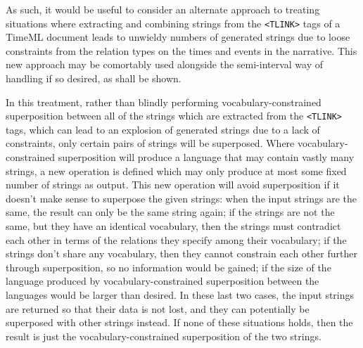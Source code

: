 \documentclass[a4paper,12pt,leqno,twoside]{article}
\begin{document}
As such, it would be useful to consider an alternate approach to treating situations where extracting and combining strings from the \verb|<TLINK>| tags of a TimeML document leads to unwieldy numbers of generated strings due to loose constraints from the relation types on the times and events in the narrative. This new approach may be comortably used alongside the semi-interval way of handling if so desired, as shall be shown.

In this treatment, rather than blindly performing vocabulary-constrained superposition between all of the strings which are extracted from the \verb|<TLINK>| tags, which can lead to an explosion of generated strings due to a lack of constraints, only certain pairs of strings will be superposed. Where vocabulary-constrained superposition will produce a language that may contain vastly many strings, a new operation is defined which may only produce at most some fixed number of strings as output. This new operation will avoid superposition if it doesn't make sense to superpose the given strings: when the input strings are the same, the result can only be the same string again; if the strings are not the same, but they have an identical vocabulary, then the strings must contradict each other in terms of the relations they specify among their vocabulary; if the strings don't share any vocabulary, then they cannot constrain each other further through superposition, so no information would be gained; if the size of the language produced by vocabulary-constrained superposition between the languages would be larger than desired. In these last two cases, the input strings are returned so that their data is not lost, and they can potentially be superposed with other strings instead. If none of these situations holds, then the result is just the vocabulary-constrained superposition of the two strings. 
\end{document}
